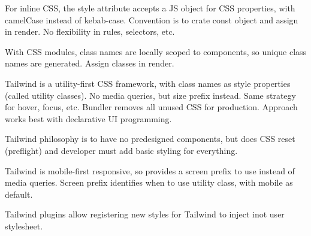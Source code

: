\documentclass[11pt]{article}
\begin{document}
For inline CSS, the style attribute accepts a JS object for CSS properties, with
camelCase instead of kebab-case.
Convention is to crate const object and assign in render.
No flexibility in rules, selectors, etc.

With CSS modules, class names are locally scoped to components, so unique class names
are generated. Assign classes in render.

Tailwind is a utility-first CSS framework, with class names as style properties (called
utility classes). No media queries, but size prefix instead.
Same strategy for hover, focus, etc.
Bundler removes all unused CSS for production.
Approach works best with declarative UI programming.

Tailwind philosophy is to have no predesigned components, but does CSS reset (preflight) and
developer must add basic styling for everything.

Tailwind is mobile-first responsive, so provides a screen prefix to use instead of media queries.
Screen prefix identifies when to use utility class, with mobile as default.

Tailwind plugins allow registering new styles for Tailwind to inject inot user stylesheet.
\end{document}
